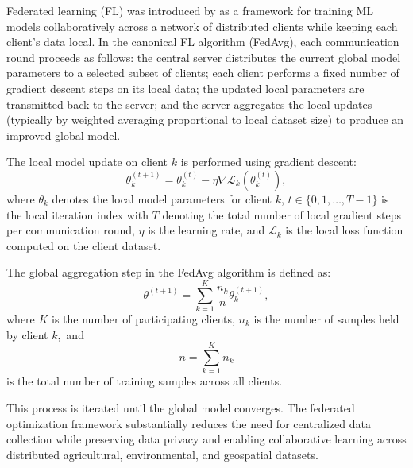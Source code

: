 \documentclass[land,review,accept,pdftex,oneauthor]{Definitions/mdpi}
\begin{document}
Federated learning (FL) was introduced by \citet{mcmahan2017communication} as a framework for training ML models collaboratively across a network of distributed clients while keeping each client's data local. In the canonical FL algorithm (FedAvg), each communication round proceeds as follows: the central server distributes the current global model parameters to a selected subset of clients; each client performs a fixed number of gradient descent steps on its local data; the updated local parameters are transmitted back to the server; and the server aggregates the local updates (typically by weighted averaging proportional to local dataset size) to produce an improved global model.

The local model update on client $k$ is performed using gradient descent:
\begin{equation}
\theta_k^{(t+1)}
=
\theta_k^{(t)}
-
\eta
\nabla \mathcal{L}_k(\theta_k^{(t)}),
\end{equation}
where $\theta_k$ denotes the local model parameters for client $k$, {$t \in \{0, 1, \dots, T-1\}$ is the local iteration index with $T$ denoting the total number of local gradient steps per communication round,} $\eta$ is the learning rate, and $\mathcal{L}_k$ is the local loss function computed on the client dataset.

The global aggregation step in the FedAvg algorithm is defined as:
\begin{equation}
\theta^{(t+1)}
=
\sum_{k=1}^{K}
\frac{n_k}{n}
\theta_k^{(t+1)},
\end{equation}
where $K$ is the number of participating clients, $n_k$ is the number of samples held by client $k$,~and
\begin{equation}
n=\sum_{k=1}^{K} n_k
\end{equation}
is the total number of training samples across all clients.

This process is iterated until the global model converges. The federated optimization framework substantially reduces the need for centralized data collection while preserving data privacy and enabling collaborative learning across distributed agricultural, environmental, and geospatial datasets.

\end{document}
